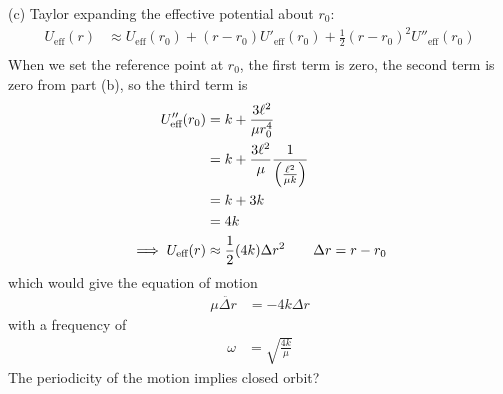 \documentclass[../hw.tex]{subfiles}
\begin{document}
(c) Taylor expanding the effective potential about $r_0$:
\begin{align*}
    U_{\text{eff}}(r) &\approx U_{\text{eff}}(r_0) + (r - r_0)U'_{\text{eff}}(r_0) + \frac{1}{2}(r - r_0)^2 U''_{\text{eff}}(r_0) \\
\end{align*}
When we set the reference point at $r_0$, the first term is zero, the second term is zero from
part (b), so the third term is
\begin{align*}
    U''_{\text{eff}}(r_0) &= k + \frac{3\ell^2}{\mu r_0^4} \\
    &= k + \frac{3\ell^2}{\mu}\frac{1}{\qt(\frac{\ell^2}{\mu k})} \\
    &= k + 3k \\
    &= 4k \\
    \implies U_{\text{eff}}(r) &\approx \frac{1}{2} (4k) \Delta r^2 \qquad \Delta r = r - r_0
\end{align*}
which would give the equation of motion 
\begin{align*}
    \mu \ddot{\Delta r} &= -4k \Delta r
\end{align*}
with a frequency of
\begin{align*}
    \omega &= \sqrt{\frac{4k}{\mu}}
\end{align*}
The periodicity of the motion implies closed orbit?

\newpage
\end{document}
